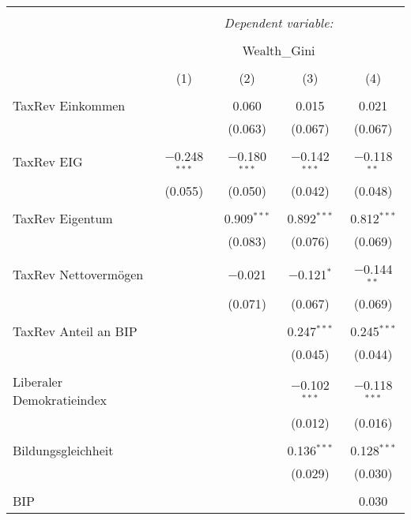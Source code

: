 
\begin{table}[!htbp] \centering 
  \caption{} 
  \label{} 
\begin{tabular}{@{\extracolsep{5pt}}lcccc} 
\\[-1.8ex]\hline 
\hline \\[-1.8ex] 
 & \multicolumn{4}{c}{\textit{Dependent variable:}} \\ 
\cline{2-5} 
\\[-1.8ex] & \multicolumn{4}{c}{Wealth\_Gini} \\ 
\\[-1.8ex] & (1) & (2) & (3) & (4)\\ 
\hline \\[-1.8ex] 
 TaxRev Einkommen &  & 0.060 & 0.015 & 0.021 \\ 
  &  & (0.063) & (0.067) & (0.067) \\ 
  & & & & \\ 
 TaxRev EIG & $-$0.248$^{***}$ & $-$0.180$^{***}$ & $-$0.142$^{***}$ & $-$0.118$^{**}$ \\ 
  & (0.055) & (0.050) & (0.042) & (0.048) \\ 
  & & & & \\ 
 TaxRev Eigentum &  & 0.909$^{***}$ & 0.892$^{***}$ & 0.812$^{***}$ \\ 
  &  & (0.083) & (0.076) & (0.069) \\ 
  & & & & \\ 
 TaxRev Nettovermögen &  & $-$0.021 & $-$0.121$^{*}$ & $-$0.144$^{**}$ \\ 
  &  & (0.071) & (0.067) & (0.069) \\ 
  & & & & \\ 
 TaxRev Anteil an BIP &  &  & 0.247$^{***}$ & 0.245$^{***}$ \\ 
  &  &  & (0.045) & (0.044) \\ 
  & & & & \\ 
 Liberaler Demokratieindex &  &  & $-$0.102$^{***}$ & $-$0.118$^{***}$ \\ 
  &  &  & (0.012) & (0.016) \\ 
  & & & & \\ 
 Bildungsgleichheit &  &  & 0.136$^{***}$ & 0.128$^{***}$ \\ 
  &  &  & (0.029) & (0.030) \\ 
  & & & & \\ 
 BIP &  &  &  & 0.030 \\ 

\end{tabular}
\end{table}
